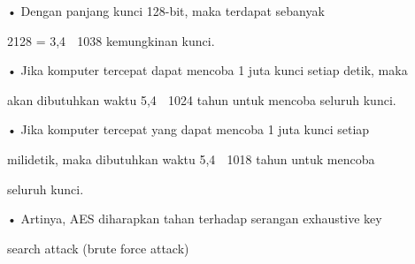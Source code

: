 \documentclass{article}
\begin{document}

• Dengan panjang kunci 128-bit, maka terdapat  sebanyak


2128 = 3,4  1038  kemungkinan kunci. 

• Jika komputer tercepat dapat mencoba 1 juta kunci setiap detik, maka 

akan dibutuhkan waktu 5,4  1024 tahun untuk mencoba seluruh kunci. 

• Jika komputer tercepat yang dapat mencoba 1 juta kunci setiap 

milidetik, maka dibutuhkan waktu 5,4  1018 tahun untuk mencoba 

seluruh kunci. 

• Artinya, AES diharapkan  tahan terhadap serangan exhaustive key 

search attack (brute force attack)
\end{document}
